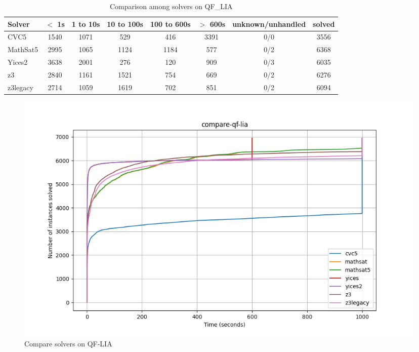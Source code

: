 \begin{table}
  \begin{tabular}{|l|c|c|c|c|c|c|c|}
    \hline
    Solver & $<$ 1s & 1 to 10s & 10 to 100s & 100 to 600s & $>$ 600s & unknown/unhandled & solved \\
    \hline
    CVC5 & 1540 & 1071 & 529 & 416 & 3391 & 0/0 & 3556 \\
    \hline
    MathSat5 & 2995 & 1065 & 1124 & 1184 & 577 & 0/2 & 6368 \\
    \hline
    Yices2 & 3638 & 2001 & 276 & 120 & 909 & 0/3 & 6035 \\
    \hline
    z3 & 2840 & 1161 & 1521 & 754 & 669 & 0/2 & 6276 \\
    \hline
    z3legacy & 2714 & 1059 & 1619 & 702 & 851 & 0/2 & 6094 \\
    \hline
    \end{tabular}
  \caption{Comparison among solvers on QF\_LIA \label{tab:compare-qf-lia}}
\end{table}
\begin{figure}[htbp]
  \centering
  \includegraphics[width=0.99\textwidth]{../data/compare-qf-lia.png}
  \caption{Compare solvers on QF-LIA }
  \label{fig:compare-qf-lia}
\end{figure}


